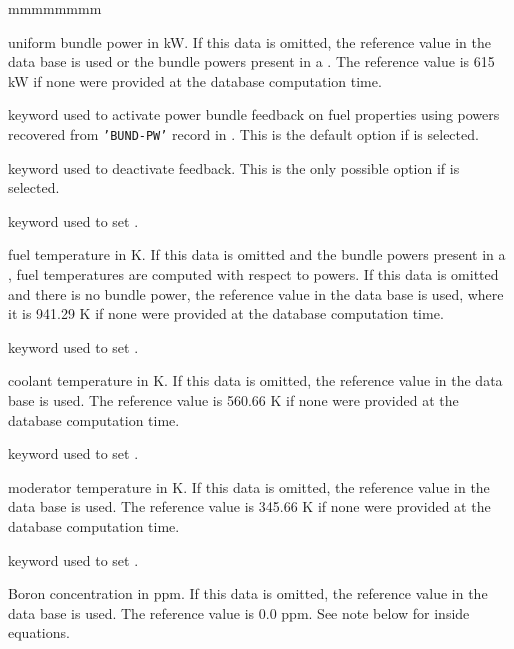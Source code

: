 \begin{ListeDeDescription}{mmmmmmmm}
\item[\dusa{pow}] uniform bundle power in kW. If this data is omitted, the
reference value in the data base is used or the bundle powers present
in a . The reference value is 615 kW if none were provided at the
database computation time.

\item[\moc{PWF}] keyword used to activate power bundle feedback on fuel properties using powers
recovered from {\tt 'BUND-PW'} record in . This is the default option
if  is selected.

\item[\moc{NPWF}] keyword used to deactivate  feedback. This is the only possible option
if  is selected.

\item[\moc{TFUEL}] keyword used to set .

\item[\dusa{tfuel}] fuel temperature in K. If this data is omitted and
the bundle powers present in a , fuel temperatures are 
computed with respect to powers.
If this data is omitted and there is no bundle power, the
reference value in the data base is used, where it is 941.29 K if none were provided at the database computation time.

\item[\moc{TCOOL}] keyword used to set .

\item[\dusa{tcool}] coolant temperature in K. If this data is omitted, the
reference value in the data base is used. The reference value is 560.66 K if none were provided at the database computation time.

\item[\moc{TMOD}] keyword used to set .

\item[\dusa{tmod}] moderator temperature in K. If this data is omitted, the
reference value in the data base is used. The reference value is 345.66 K if none were provided at the database computation time.

\item[\moc{BORON}] keyword used to set .

\item[\dusa{nB}] Boron concentration in ppm. If this data is omitted, the
reference value in the data base is used. The reference value is 0.0 ppm. See note below for inside equations.


\end{ListeDeDescription}
